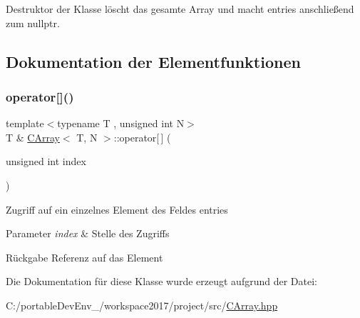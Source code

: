 Destruktor der Klasse löscht das gesamte Array und macht entries anschließend zum nullptr. 



\subsection{Dokumentation der Elementfunktionen}
\mbox{\label{class_c_array_a81dc8949159e2f4b213d33a5d2b5aec7}} 
\subsubsection{\texorpdfstring{operator[]()}{operator[]()}}
{\footnotesize\ttfamily template$<$typename T , unsigned int N$>$ \\
T \& \hyperlink{class_c_array}{C\+Array}$<$ T, N $>$\+::operator\mbox{[}$\,$\mbox{]} (\begin{DoxyParamCaption}\item[{unsigned int}]{index }\end{DoxyParamCaption})}

Zugriff auf ein einzelnes Element des Feldes entries 
\begin{DoxyParams}{Parameter}
{\em index} & Stelle des Zugriffs \\
\hline
\end{DoxyParams}
\begin{DoxyReturn}{Rückgabe}
Referenz auf das Element 
\end{DoxyReturn}


Die Dokumentation für diese Klasse wurde erzeugt aufgrund der Datei\+:\begin{DoxyCompactItemize}
\item 
C\+:/portable\+Dev\+Env\+\_/workspace2017/project/src/\hyperlink{_c_array_8hpp}{C\+Array.\+hpp}\end{DoxyCompactItemize}
